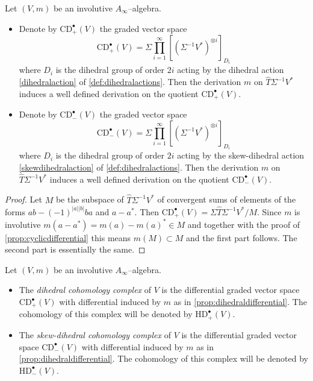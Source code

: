 \documentclass[british]{amsart}
\theoremstyle{plain}
\theoremstyle{definition}
{
\newaliascnt{{definition}}{theorem}\newtheorem{{definition}}[{definition}]{{Definition}}\aliascntresetthe{{definition}}\expandafterautorefname\endcsname{{Definition}}}
{
\newaliascnt{{remark}}{theorem}\newtheorem{{remark}}[{remark}]{{Remark}}\aliascntresetthe{{remark}}\expandafterautorefname\endcsname{{Remark}}}
{
\newaliascnt{{example}}{theorem}\newtheorem{{example}}[{example}]{{Example}}\aliascntresetthe{{example}}\expandafterautorefname\endcsname{{Example}}}
{
\newaliascnt{{examples}}{theorem}\newtheorem{{examples}}[{examples}]{{Examples}}\aliascntresetthe{{examples}}\expandafterautorefname\endcsname{{Examples}}}
{
\newaliascnt{{notation}}{theorem}\newtheorem{{notation}}[{notation}]{{Notation}}\aliascntresetthe{{notation}}\expandafterautorefname\endcsname{{Notation}}}
{
\newaliascnt{{convention}}{theorem}\newtheorem{{convention}}[{convention}]{{Convention}}\aliascntresetthe{{convention}}\expandafterautorefname\endcsname{{Convention}}}
\numberwithin{equation}{section}
\numberwithin{figure}{section}
\begin{document}
\begin{proposition}\label{prop:dihedraldifferential}
Let $(V, m)$ be an involutive $A_\infty$--algebra.
\begin{itemize}
\item Denote by ${\mathrm{CD}}^{\bullet}_+(V)$ the graded vector space
\[
{\mathrm{CD}}^{\bullet}_+(V)= \Sigma \prod_{i=1}^{\infty}[ (\Sigma^{-1} V^*)^{\otimes i} ]_{D_{i}}
\]
where $D_i$ is the dihedral group of order $2i$ acting by the dihedral action \ref{dihedralaction} of \autoref{def:dihedralactions}. Then the derivation $m$ on $\widehat{T}\Sigma^{-1}V^*$ induces a well defined derivation on the quotient ${\mathrm{CD}}^\bullet_+(V)$.
\item Denote by ${\mathrm{CD}}^{\bullet}_-(V)$ the graded vector space
\[
{\mathrm{CD}}^\bullet_-(V) = \Sigma \prod_{i=1}^{\infty}[ (\Sigma^{-1} V^*)^{\otimes i} ]_{D_{i}}
\]
where $D_i$ is the dihedral group of order $2i$ acting by the skew-dihedral action \ref{skewdihedralaction} of \autoref{def:dihedralactions}. Then the derivation $m$ on $\widehat{T}\Sigma^{-1}V^*$ induces a well defined derivation on the quotient ${\mathrm{CD}}^\bullet_-(V)$.
\end{itemize}
\end{proposition}

\begin{proof}
Let $M$ be the subspace of $\widehat{T}\Sigma^{-1}V^*$ of convergent sums of elements of the forms $ab - (-1)^{{\lvert {a} \rvert}{\lvert {b} \rvert}}ba$ and $a - a^*$. Then ${\mathrm{CD}}^\bullet_+(V) = \Sigma\widehat{T}\Sigma^{-1}V^*/M$. Since $m$ is involutive $m(a-a^*) = m(a)-m(a)^* \in M$ and together with the proof of \autoref{prop:cyclicdifferential} this means $m(M)\subset M$ and the first part follows. The second part is essentially the same.
\end{proof}

\begin{definition}
Let $(V,m)$ be an involutive $A_\infty$--algebra.
\begin{itemize}
\item The \emph{dihedral cohomology complex} of $V$ is the differential graded vector space ${\mathrm{CD}}^\bullet_+(V)$ with differential induced by $m$ as in \autoref{prop:dihedraldifferential}. The cohomology of this complex will be denoted by ${\mathrm{HD}}^{\bullet}_+(V)$.
\item The \emph{skew-dihedral cohomology complex} of $V$ is the differential graded vector space ${\mathrm{CD}}^\bullet_-(V)$ with differential induced by $m$ as in \autoref{prop:dihedraldifferential}. The cohomology of this complex will be denoted by ${\mathrm{HD}}^\bullet_-(V)$.
\end{itemize}
\end{definition}
\end{document}
